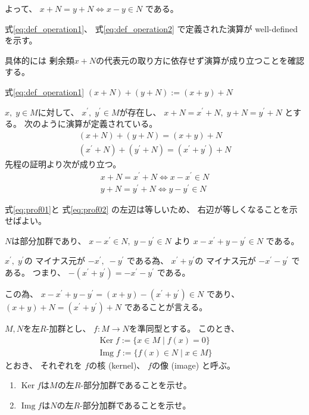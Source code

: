 \documentclass[12pt,b5paper]{ltjsarticle}
\newcommand{\Ker}{\mathop{\mathrm{Ker}}\nolimits}
\newcommand{\Img}{\mathop{\mathrm{Img}}\nolimits}
\begin{document}
よって、
$x + N = y + N \Longleftrightarrow x-y \in N$
である。


式\eqref{eq:def_operation1}、
式\eqref{eq:def_operation2}
で定義された演算が well-defined を示す。

具体的には
剰余類$x+N$の代表元の取り方に依存せず演算が成り立つことを確認する。


式\eqref{eq:def_operation1}
$(x+N)+(y+N) := (x+y) +N$

$x,\;y\in M$に対して、
$x^{\prime},\;y^{\prime} \in M$が存在し、
$x+N = x^{\prime} +N ,\; y+N = y^{\prime} +N$
とする。
次のように演算が定義されている。
\begin{gather}
 \label{eq:prof01}
  (x+N)+(y+N) = (x+y) +N\\
  \label{eq:prof02}
  (x^{\prime}+N)+(y^{\prime}+N) = (x^{\prime}+y^{\prime}) +N
\end{gather}
先程の証明より次が成り立つ。
\begin{gather}
 x+N = x^{\prime} +N \Longleftrightarrow x-x^{\prime} \in N\\
 y+N = y^{\prime} +N \Longleftrightarrow y-y^{\prime} \in N
\end{gather}

式\eqref{eq:prof01}と
式\eqref{eq:prof02}
の左辺は等しいため、
右辺が等しくなることを示せばよい。

$N$は部分加群であり、
$x-x^{\prime} \in N,\;y-y^{\prime} \in N$
より
$x-x^{\prime} +  y-y^{\prime} \in N$
である。

$x^{\prime},\;y^{\prime}$の
マイナス元が
$-x^{\prime},\;-y^{\prime}$
である為、
$x^{\prime}+y^{\prime}$の
マイナス元が
$-x^{\prime}-y^{\prime}$
である。
つまり、
$-(x^{\prime}+y^{\prime})=-x^{\prime}-y^{\prime}$
である。

この為、
$x-x^{\prime} +  y-y^{\prime} = (x+y) -(x^{\prime}+y^{\prime}) \in N$
であり、
$(x+y)+N =  (x^{\prime}+y^{\prime}) + N$
であることが言える。




\hrulefill

$M,N$を左$R$-加群とし、
$f:M\to N$を準同型とする。
このとき、
\begin{gather}
 \Ker{f} := \{ x\in M \mid f(x) = 0\}\\
 \Img{f} := \{ f(x) \in N \mid x\in M\}
\end{gather}
とおき、
それぞれを
$f$の核 (kernel)、
$f$の像 (image)
と呼ぶ。

\begin{enumerate}
 \item $\Ker{f}$は$M$の左$R$-部分加群であることを示せ。
 \item $\Img{f}$は$N$の左$R$-部分加群であることを示せ。
\end{enumerate}
\end{document}
